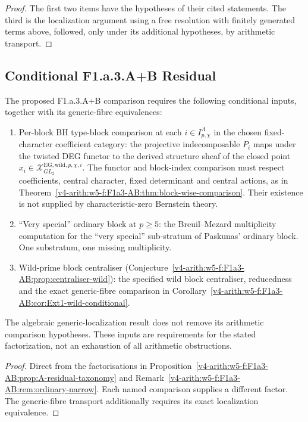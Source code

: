 \begin{proof}
The first two items have the hypotheses of their cited statements.
The third is the localization argument using a free resolution with finitely generated terms above,
followed, only under its additional hypotheses, by arithmetic transport.
\end{proof}

\subsection{Conditional F1.a.3.A+B Residual}

\begin{proposition}
\label{v4-arith:w5-f:F1a3-AB:prop:remainder-AB}
\ClaimStatusProvedHere The proposed F1.a.3.A+B comparison requires the following
conditional inputs, together with its generic-fibre equivalences:
\begin{enumerate}
\item[\textbf{(R.A)}] Per-block BH type-block comparison at each
$i\in I_{p,\chi}^{\Lambda}$ in the chosen fixed-character coefficient category: the projective
indecomposable \(P_{i}\) maps under the twisted DEG
functor to the derived structure sheaf of the closed point
\(x_{i}\in\mathcal{X}^{\mathrm{EG,wild},p,\chi,i}_{GL_{2}}\).
The functor and block-index comparison must respect coefficients,
central character, fixed determinant and central actions, as in
Theorem~\ref{v4-arith:w5-f:F1a3-AB:thm:block-wise-comparison}. Their existence
is not supplied by characteristic-zero Bernstein theory.
\item[\textbf{(R.B.1)}] ``Very special'' ordinary block at
\(p\geq 5\): the Breuil--Mezard multiplicity computation for the
``very special'' sub-stratum of Paskunas' ordinary block. One
substratum, one missing multiplicity.
\item[\textbf{(R.B.2)}] Wild-prime block centraliser
(Conjecture~\ref{v4-arith:w5-f:F1a3-AB:prop:centraliser-wild}): the specified wild block centraliser, reducedness and the
exact generic-fibre comparison in
Corollary~\ref{v4-arith:w5-f:F1a3-AB:cor:Ext1-wild-conditional}.
\end{enumerate}
The algebraic generic-localization result does not remove its
arithmetic comparison hypotheses. These inputs are requirements
for the stated factorization, not an exhaustion of all arithmetic obstructions.
\end{proposition}

\begin{proof}
Direct from the factorisations in
Proposition~\ref{v4-arith:w5-f:F1a3-AB:prop:A-residual-taxonomy} and
Remark~\ref{v4-arith:w5-f:F1a3-AB:rem:ordinary-narrow}. Each named comparison supplies a different factor. The generic-fibre
transport additionally requires its exact localization equivalence.
\end{proof}

